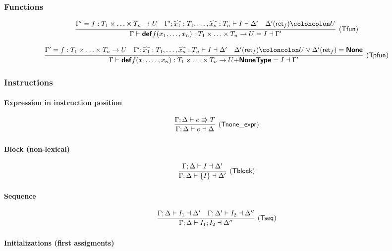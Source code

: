 \documentclass[a4paper]{article}
\newcommand{\kw}[1]{\textsf{\textbf{#1}}}
\newcommand{\mcode}[1]{\mathsf{#1}}
\newcommand{\colcol}{\coloncolon}
\newcommand{\yield}{\Rrightarrow}
\newcommand{\fun}[1]{\mathsf{#1}}
\begin{document}
\subsubsection{Functions}

$$
\infer[(\fun{Tfun})]{\Gamma \vdash \kw{def} f(x_1,\ldots,x_n) : T_1 \times \ldots \times T_n \rightarrow U = I \dashv \Gamma'}
{\Gamma'=f:T_1\times \ldots \times T_n\rightarrow U & \Gamma';\widehat{x_1}:T_1,\ldots,\widehat{x_n}:T_n \vdash I \dashv \Delta' & \Delta'(\fun{ret}_f) \colcol U}
$$

$$
\infer[(\fun{Tpfun})]{\Gamma \vdash \kw{def} f(x_1,\ldots,x_n) : T_1 \times \ldots \times T_n \rightarrow U \mathsf{+} \kw{NoneType} = I \dashv \Gamma'}
{\Gamma'=f:T_1\times \ldots \times T_n\rightarrow U & \Gamma';\widehat{x_1}:T_1,\ldots,\widehat{x_n}:T_n \vdash I \dashv \Delta' & \Delta'(\fun{ret}_f) \colcol U \lor \Delta'(\fun{ret}_f)=\kw{None}}
$$

\subsubsection{Instructions}

\paragraph{Expression in instruction position}

$$
\infer[(\fun{Tnone\_expr})]{\Gamma ; \Delta \vdash e \dashv \Delta}
{\Gamma;\Delta \vdash e \yield T}
$$

\paragraph{Block (non-lexical)}

$$
\infer[(\fun{Tblock})]{\Gamma;\Delta \vdash \mcode{\{}I\mcode{\}} \dashv \Delta'}
{\Gamma;\Delta \vdash I \dashv \Delta'}
$$

\paragraph{Sequence}

$$
\infer[(\fun{Tseq})]{\Gamma;\Delta \vdash I_1;I_2 \dashv \Delta''}
{\Gamma;\Delta \vdash I_1 \dashv \Delta' & \Gamma;\Delta'\vdash I_2 \dashv \Delta''}
$$

\paragraph{Initializations (first assigments)}
\end{document}
